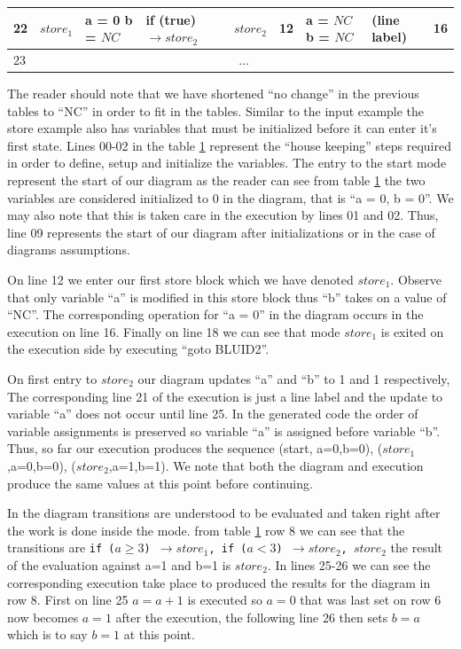 \begin{table}[htcb]
\begin{tabular}{|p{} | p{} | p{} | p{} | p{} | p{} | p{} | p{} | p{} |}
			\hline
			22&$store_1$			&	a = 0 \newline b = $NC$		&	if (true) $\rightarrow store_2$ & $store_2$			&	12					&	a = $NC$ \newline b = $NC$	&	(line label)				&	16	\\
			\hline
			23&\multicolumn{8}{|c|}{...}\\
			\hline
		\end{tabular}
	\label{table:StoreExecCombined}
\end{table}

The reader should note that we have shortened ``no change'' in the previous tables to ``NC'' in order to fit
in the tables.  Similar to the input example the store example also has variables that must be initialized 
before it can enter it's first state. Lines 00-02 in the table \ref{table:StoreExecCombined} represent the 
``house keeping'' steps required in order to define, setup and initialize the variables. The entry to the start
mode represent the start of our diagram as the reader can see from table \ref{table:StoreExecCombined} the two
variables are considered initialized to 0 in the diagram, that is ``a = 0, b = 0''. We may also note that this
is taken care in the execution by lines 01 and 02. Thus, line 09 represents the start of our diagram after 
initializations or in the case of diagrams assumptions.

On line 12 we enter our first store block which we
have denoted $store_1$. Observe that only variable ``a'' is modified in this store block thus ``b'' takes on 
a value of ``NC''. The corresponding operation for ``a = 0'' in the diagram occurs in the execution on line 16.
Finally on line 18 we can see that mode $store_1$ is exited on the execution side by executing ``goto BLUID2''.

On first entry to $store_2$ our diagram updates ``a'' and ``b'' to 1 and 1 respectively, The corresponding line 21 of
the execution is just a line label and the update to variable ``a'' does not occur until line 25. In the generated
code the order of variable assignments is preserved so variable ``a'' is assigned before variable ``b''. Thus, so
far our execution produces the sequence (start, {a=0,b=0}), ($store_1$,{a=0,b=0}), ($store_2$,{a=1,b=1}). We note that
both the diagram and execution produce the same values at this point before continuing.

In the diagram transitions are understood to be evaluated and taken right after the work is done inside the mode.
from table \ref{table:StoreExecCombined} row 8 we can see that the transitions are 
\texttt{if ($a \geq 3$) $\rightarrow store_1$, if ($a < 3$) $\rightarrow store_2$, $store_2$} the result of the
evaluation against a=1 and b=1 is $store_2$. In lines 25-26 we can see the corresponding execution take place to
produced the results for the diagram in row 8. First on line 25 $a = a + 1$ is executed so $a = 0$ that was last set
on row 6 now becomes $a = 1$ after the execution, the following line 26 then sets $b = a$ which is to say $b = 1$ at
this point.

